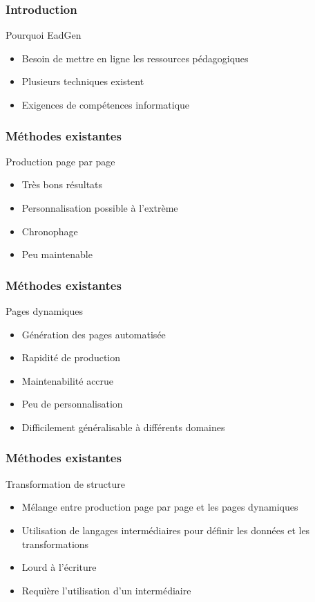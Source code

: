 \begin{frame}
	\frametitle{Introduction}
	\begin{block}{Pourquoi EadGen}
		\begin{itemize}
			\item Besoin de mettre en ligne les ressources pédagogiques 
			\item Plusieurs techniques existent
			\item Exigences de compétences informatique
		\end{itemize}
	\end{block}
\end{frame}

\author{Guillaume Minette de Saint-Martin}
\begin{frame}
	\frametitle{Méthodes existantes}
	\begin{block}{Production page par page}
		\begin{itemize}
			\item Très bons résultats
			\item Personnalisation possible à l'extrème
			\item Chronophage
			\item Peu maintenable
		\end{itemize}
	\end{block}
\end{frame}
\begin{frame}
	\frametitle{Méthodes existantes}
	\begin{block}{Pages dynamiques}
		\begin{itemize}
			\item Génération des pages automatisée
			\item Rapidité de production
			\item Maintenabilité accrue
			\item Peu de personnalisation
			\item Difficilement généralisable à différents domaines
		\end{itemize}
	\end{block}
\end{frame}
\begin{frame}
	\frametitle{Méthodes existantes}
	\begin{block}{Transformation de structure}
		\begin{itemize}
			\item Mélange entre production page par page et les pages dynamiques
			\item Utilisation de langages intermédiaires pour définir les données et les transformations
			\item Lourd à l'écriture
			\item Requière l'utilisation d'un intermédiaire 
		\end{itemize}
	\end{block}
\end{frame}